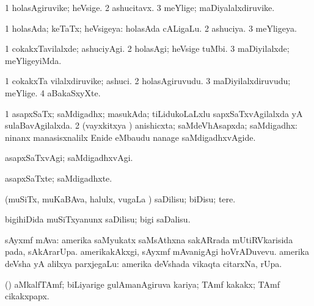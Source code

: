 \bentry
{} 
\gl{\nA}
\expl{}
\bmng
\bnum
\num{1} holasAgiruvike; heVsige. 
\num{2} ashucitavx. 
\num{3} meYlige; maDiyalalxdiruvike. 
\enum
\emng
\eentry

\bentry
{} 
\gl{\gu}
\expl{}
\bmng
\bnum
\num{1} holasAda; keTaTx; heVsigeya:  holasAda cALigaLu. 
\num{2} ashuciya. 
\num{3} meYligeya. 
\enum
\emng
\eentry

\bentry
{} 
\gl{\kirxvi}
\expl{}
\bmng
\bnum
\num{1} cokakxTavilalxde; ashuciyAgi. 
\num{2} holasAgi; heVsige tuMbi. 
\num{3} maDiyilalxde; meYligeyiMda. 
\enum
\emng
\eentry

\bentry
{} 
\gl{\nA}
\expl{}
\bmng
\bnum
\num{1} cokakxTa vilalxdiruvike; ashuci. 
\num{2} holasAgiruvudu. 
\num{3} maDiyilalxdiruvudu; meYlige. 
\num{4} aBakaSxyXte. 
\enum
\emng
\eentry

\bentry
{} 
\gl{\gu}
\expl{}
\bmng
\bnum
\num{1} asapxSaTx; saMdigadhx; masukAda; tiLidukoLaLxlu sapxSaTxvAgilalxda yA sulaBavAgilalxda. 
\num{2} (vayxkitxya \vi) anishicxta; saMdeVhAsapxda; saMdigadhx:  ninanx manasisxnalilx Enide eMbaudu nanage saMdigadhxvAgide. 
\enum
\emng
\eentry

\bentry
{} 
\gl{\kirxvi}
\expl{}
\bmng
asapxSaTxvAgi; saMdigadhxvAgi. 
\emng
\eentry

\bentry
{} 
\gl{\nA}
\expl{}
\bmng
asapxSaTxte; saMdigadhxte. 
\emng
\eentry

\bentry
{} 
\gl{\sakirx}
\expl{}
\bmng
(muSiTx, muKaBAva, halulx, \mo vugaLa \vi) saDilisu; biDisu; tere. 
\emng

\noindent 
\gl{\akirx}
\expl{}
\bmng
bigihiDida muSiTxyanunx saDilisu; bigi saDalisu. 
\emng
\eentry

\bentry
{}
\gl{\nA}
\expl{}
\bmng
sAyxmf mAva: 
\banum
{} amerika saMyukatx saMsAthxna sakARrada mUtiRVkarisida pada, sAkArarUpa.  amerikakAkxgi, sAyxmf mAvanigAgi hoVrADuvevu. 
 amerika deVsha yA alilxya parxjegaLu:  amerika deVshada vikaqta citarxNa, rUpa. 
\eanum
\emng
\eentry

\bentry
{}
\gl{\nA}
\expl{}
\bmng
(\ame) aMkalfTAmf; biLiyarige gulAmanAgiruva kariya; TAmf kakakx; TAmf cikakxpapx. 
\emng
\eentry

